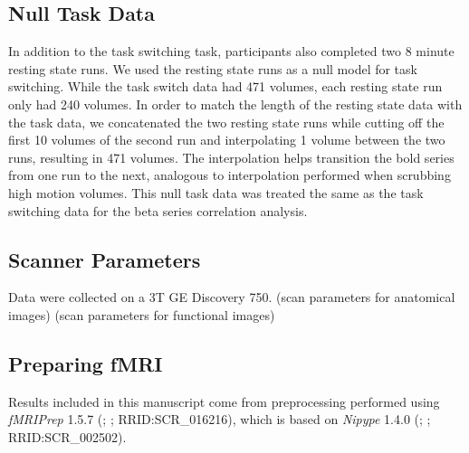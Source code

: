 \documentclass[10pt,letterpaper]{article}
\begin{document}
\subsection*{Null Task Data}
In addition to the task switching task, participants also completed
two 8 minute resting state runs.
We used the resting state runs as a null model for task switching.
While the task switch data had 471 volumes, each resting state run only had
240 volumes.
In order to match the length of the resting state data with the task data, we concatenated
the two resting state runs while cutting off the first 10 volumes of the second run
and interpolating 1 volume between the two runs, resulting in 471 volumes.
The interpolation helps transition the bold series from one run to the next,
analogous to interpolation performed when scrubbing high motion volumes. 
This null task data was treated the same as the task switching data for the
beta series correlation analysis.

\subsection{Scanner Parameters}
Data were collected on a 3T GE Discovery 750.
(scan parameters for anatomical images)
(scan parameters for functional images)


\subsection{Preparing fMRI}
Results included in this manuscript come from preprocessing performed
using \emph{fMRIPrep} 1.5.7 (\cite{fmriprep1}; \cite{fmriprep2}; RRID:SCR\_016216),
which is based on \emph{Nipype} 1.4.0
(\cite{nipype1}; \cite{nipype2}; RRID:SCR\_002502).
\end{document}
